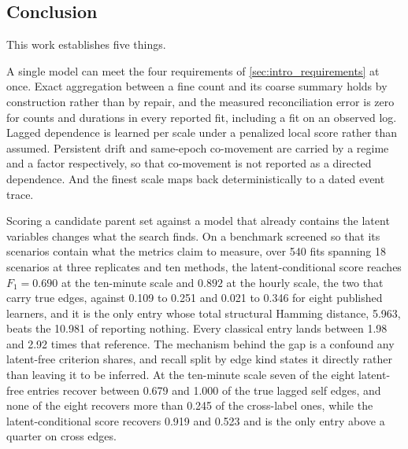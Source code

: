 \subsection{Conclusion}
\label{sec:conclusion}

This work establishes five things.

A single model can meet the four requirements of
\cref{sec:intro_requirements} at once. Exact aggregation between a fine count and
its coarse summary holds by construction rather than by repair, and the measured
reconciliation error is zero for counts and durations in every reported fit,
including a fit on an observed log. Lagged dependence is learned per scale under
a penalized local score rather than assumed. Persistent drift and same-epoch
co-movement are carried by a regime and a factor respectively, so that
co-movement is not reported as a directed dependence. And the finest scale maps
back deterministically to a dated event trace.

Scoring a candidate parent set against a model that already contains the latent
variables changes what the search finds. On a benchmark screened so that its
scenarios contain what the metrics claim to measure, over 540 fits spanning 18
scenarios at three replicates and ten methods, the latent-conditional score
reaches \(F_1 = 0.690\) at the ten-minute scale and \(0.892\) at the hourly
scale, the two that carry true edges, against 0.109 to 0.251 and 0.021 to 0.346
for eight published learners, and it is the only entry whose total structural
Hamming distance, 5.963, beats the 10.981 of reporting nothing. Every classical
entry lands between 1.98 and 2.92 times that reference. The mechanism behind the
gap is a confound any latent-free criterion shares, and recall split by edge kind
states it directly rather than leaving it to be inferred. At the ten-minute scale
seven of the eight latent-free entries recover between 0.679 and 1.000 of the
true lagged self edges, and none of the eight recovers more than 0.245 of the
cross-label ones, while the latent-conditional score recovers 0.919 and 0.523 and
is the only entry above a quarter on cross edges.

